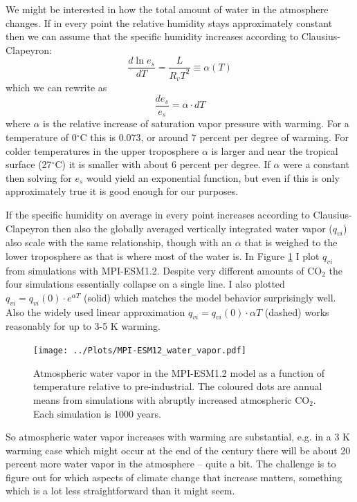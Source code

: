 \documentclass[12pt]{book}
\begin{document}
We might be interested in how the total amount of water in the atmosphere changes. If in every point the relative humidity stays approximately constant then we can assume that the specific humidity increases according to Clausius-Clapeyron:
$$\frac{d\ln e_s}{dT} = \frac{L}{R_v T^2} \equiv \alpha(T) $$
which we can rewrite as 
$$ \frac{d e_s}{e_s} = \alpha \cdot dT$$
where $\alpha$ is the relative increase of saturation vapor pressure with warming. For a temperature of 0$^\circ$C this is 0.073, or around 7 percent per degree of warming. For colder temperatures in the upper troposphere $\alpha$ is larger and near the tropical surface (27$^\circ$C) it is smaller with about 6 percent per degree. If $\alpha$ were a constant then solving for $e_s$ would yield an exponential function, but even if this is only approximately true it is good enough for our purposes. 

If the specific humidity on average in every point increases according to Clausius-Clapeyron then also the globally averaged vertically integrated water vapor ($q_{vi}$) also scale with the same relationship, though with an $\alpha$ that is weighed to the lower troposphere as that is where most of the water is. In Figure \ref{fig:mpi-esm12_water_vapor} I plot $q_{vi}$ from simulations with MPI-ESM1.2. Despite very different amounts of CO$_2$ the four simulations essentially collapse on a single line. I also plotted $q_{vi} = q_{vi}(0) \cdot e^{\alpha T}$ (solid) which matches the model behavior surprisingly well. Also the widely used linear approximation $q_{vi} = q_{vi}(0) \cdot \alpha T$ (dashed) works reasonably for up to 3-5 K warming.

\begin{figure}
\begin{center}
\texttt{[image: ../Plots/MPI-ESM12\_water\_vapor.pdf]}
\end{center}
\caption{ Atmospheric water vapor in the MPI-ESM1.2 model as a function of temperature relative to pre-industrial. The coloured dots are annual means from simulations with abruptly increased atmospheric CO$_2$. Each simulation is 1000 years. } 
\label{fig:mpi-esm12_water_vapor}
\end{figure}

So atmospheric water vapor increases with warming are substantial, e.g. in a 3 K warming case which might occur at the end of the century there will be about 20 percent more water vapor in the atmosphere -- quite a bit. The challenge is to figure out for which aspects of climate change that increase matters, something which is a lot less straightforward than it might seem.
\end{document}
